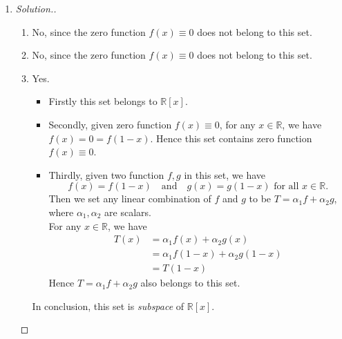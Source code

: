 \begin{enumerate}
\begin{proof}[Solution.]
\[
\begin{aligned}
\bm D &=\bm S^{-1}\bm A\bm S\\
      &=\begin{bmatrix}
1&2\\2&3
\end{bmatrix}^{-1}\begin{pmatrix}
3&0\\1&-1
\end{pmatrix}\begin{bmatrix}
1&2\\2&3
\end{bmatrix}
      &=\begin{bmatrix}
-11&-20\\7&13
\end{bmatrix}
\end{aligned}
\]
\end{proof}
\item\begin{proof}[Solution.]
\begin{enumerate}
\item
No, since the zero function $f(x)\equiv0$ does not belong to this set.
\item
No, since the zero function $f(x)\equiv0$ does not belong to this set.
\item
Yes.\begin{itemize}
\item
Firstly this set belongs to $\mathbb{R}[x]$.
\item
Secondly, given zero function $f(x)\equiv0$, for any $x\in\mathbb{R}$, we have $f(x)=0=f(1-x)$. Hence this set contains zero function $f(x)\equiv0$.
\item
Thirdly, given two function $f,g$ in this set, we have 
\[f(x)=f(1-x)\quad \text{and}\quad g(x)=g(1-x) \text{   for all $x\in\mathbb{R}$.}\]
Then we set any linear combination of $f$ and $g$ to be $T=\alpha_1 f+\alpha_2 g$, where $\alpha_1,\alpha_2$ are scalars.\\
For any $x\in\mathbb{R}$, we have
\[
\begin{aligned}
T(x)  &= \alpha_1 f(x)+\alpha_2 g(x)\\
      &= \alpha_1 f(1-x)+\alpha_2 g(1-x)\\
      &= T(1-x)
\end{aligned}
\]
Hence $T=\alpha_1 f+\alpha_2 g$ also belongs to this set.
\end{itemize}
In conclusion, this set is \emph{subspace} of $\mathbb{R}[x]$.
\end{enumerate}

\end{proof}
\end{enumerate}
